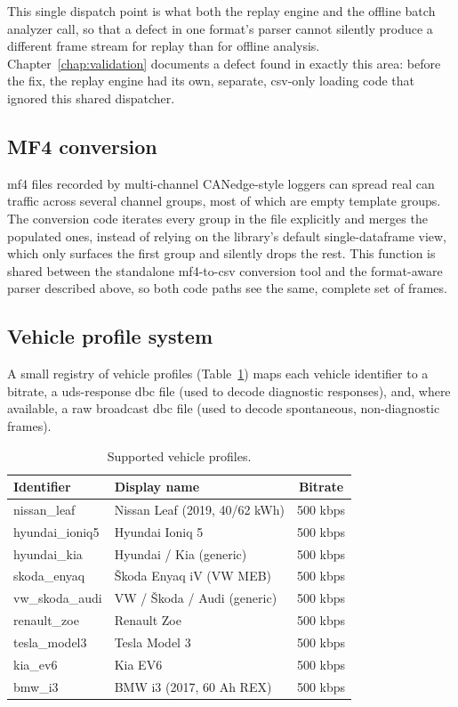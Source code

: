 This single dispatch point is what both the replay engine and the offline batch analyzer call, so that a defect in one format's parser cannot silently produce a different frame stream for replay than for offline analysis. Chapter~\ref{chap:validation} documents a defect found in exactly this area: before the fix, the replay engine had its own, separate, \gls{csv}-only loading code that ignored this shared dispatcher.

\subsection{MF4 conversion}
\label{sec:impl-mf4}

\gls{mf4} files recorded by multi-channel CANedge-style loggers can spread real \gls{can} traffic across several channel groups, most of which are empty template groups. The conversion code iterates every group in the file explicitly and merges the populated ones, instead of relying on the library's default single-dataframe view, which only surfaces the first group and silently drops the rest. This function is shared between the standalone \gls{mf4}-to-\gls{csv} conversion tool and the format-aware parser described above, so both code paths see the same, complete set of frames.

\subsection{Vehicle profile system}
\label{sec:impl-vehicle}

A small registry of vehicle profiles (Table~\ref{tab:vehicles}) maps each vehicle identifier to a bitrate, a \gls{uds}-response \gls{dbc} file (used to decode diagnostic responses), and, where available, a raw broadcast \gls{dbc} file (used to decode spontaneous, non-diagnostic frames).

\begin{table}[H]
\centering
\caption{Supported vehicle profiles.}
\label{tab:vehicles}
\begin{tabular}{|l|l|c|}
\hline
\textbf{Identifier} & \textbf{Display name} & \textbf{Bitrate} \\
\hline
nissan\_leaf    & Nissan Leaf (2019, 40/62 kWh) & 500 kbps \\
\hline
hyundai\_ioniq5 & Hyundai Ioniq 5               & 500 kbps \\
\hline
hyundai\_kia    & Hyundai / Kia (generic)       & 500 kbps \\
\hline
skoda\_enyaq    & Škoda Enyaq iV (VW MEB)       & 500 kbps \\
\hline
vw\_skoda\_audi & VW / Škoda / Audi (generic)   & 500 kbps \\
\hline
renault\_zoe    & Renault Zoe                   & 500 kbps \\
\hline
tesla\_model3   & Tesla Model 3                 & 500 kbps \\
\hline
kia\_ev6        & Kia EV6                       & 500 kbps \\
\hline
bmw\_i3         & BMW i3 (2017, 60 Ah REX)      & 500 kbps \\
\hline
\end{tabular}
\end{table}

